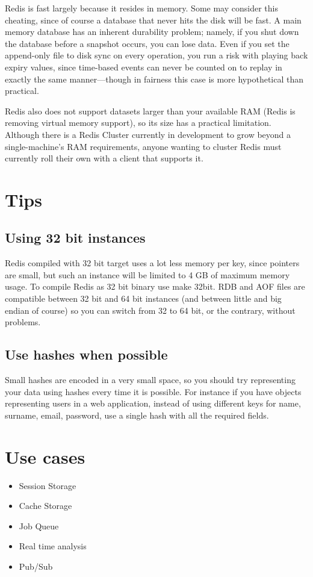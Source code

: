 Redis is fast largely because it resides in memory. Some may consider this cheating, since of course a database that never hits the disk will be fast. A main memory database has an inherent durability problem; namely, if you shut down the database before a snapshot occurs, you can lose data. Even if you set the append-only file to disk sync on every operation, you run a risk with playing back expiry values, since time-based events can never be counted on to replay in exactly the same manner—though in fairness this case is more hypothetical than practical.

Redis also does not support datasets larger than your available RAM (Redis is removing virtual memory support), so its size has a practical limitation. Although there is a Redis Cluster currently in development to grow beyond a single-machine’s RAM requirements, anyone wanting to cluster Redis must currently roll their own with a client that supports it.\cite{seven_databases}

\section{Tips}

\subsection{Using 32 bit instances}

Redis compiled with 32 bit target uses a lot less memory per key, since pointers are small, but such an instance will be limited to 4 GB of maximum memory usage. To compile Redis as 32 bit binary use make 32bit. RDB and AOF files are compatible between 32 bit and 64 bit instances (and between little and big endian of course) so you can switch from 32 to 64 bit, or the contrary, without problems.

\subsection{Use hashes when possible}

Small hashes are encoded in a very small space, so you should try representing your data using hashes every time it is possible. For instance if you have objects representing users in a web application, instead of using different keys for name, surname, email, password, use a single hash with all the required fields.

\section{Use cases}

\begin{itemize}
  \item Session Storage
  \item Cache Storage
  \item Job Queue
  \item Real time analysis
  \item Pub/Sub
\end{itemize}